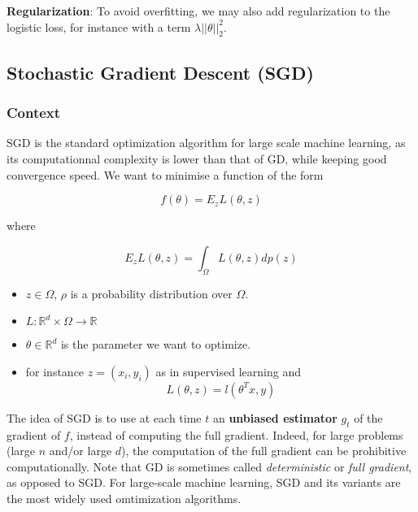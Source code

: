 \documentclass[
10pt, %
a4paper, %
oneside, %
headinclude,footinclude, %
BCOR5mm, %
]{scrartcl}
\begin{document}
\textbf{{Regularization}}: To avoid overfitting, we may also add regularization to the logistic loss, for instance with a term $ \lambda || \theta||_2^2$.

\subsection{\large\color{MidnightBlue}Stochastic Gradient Descent (SGD)}
\label{sec:sgd}

\subsubsection{\large\color{Periwinkle}Context}

SGD is the standard optimization algorithm for large scale machine learning, as its computationnal complexity is lower than that of GD, while keeping good convergence speed. We want to minimise a function of the form

\begin{equation*}
    f(\theta)=  E_z L(\theta, z)
\end{equation*}

where 

\begin{equation*}
    E_z L(\theta, z) = \int_{\Omega} L(\theta, z)dp(z)
\end{equation*}


\begin{itemize}
    \item $z\in \Omega$, $\rho$ is a probability distribution over $ \Omega$.
    \item $L: \mathbb{R}^d\times \Omega \rightarrow \mathbb{R}$
    \item $\theta \in \mathbb{R}^d$ is the parameter we want to optimize.
    \item for instance $ z = (x_i, y_i)$ as in supervised learning and
\begin{equation*}
    L(\theta, z) = l(\theta^T x, y)
\end{equation*}
\end{itemize}

The idea of SGD is to use at each time $t$ an \textbf{{unbiased estimator}}
$g_t$  of the gradient of $f$, instead of computing the full gradient. Indeed,
for large problems (large $n$ and/or large $d$), the computation of the full gradient can be prohibitive computationally. Note that GD is
sometimes called \textit{{deterministic}} or \textit{{full gradient}}, as opposed to SGD.  
For large-scale machine learning, SGD and its variants are the most widely used
omtimization algorithms.
\\
\end{document}
